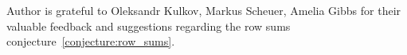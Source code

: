 ﻿Author is grateful to Oleksandr Kulkov, Markus Scheuer, Amelia Gibbs for their valuable feedback and suggestions
regarding the row sums conjecture~\eqref{conjecture:row_sums}.
